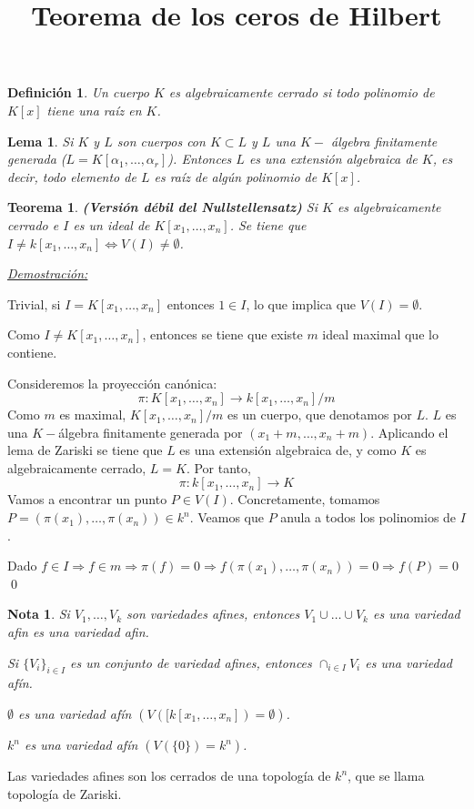 \documentclass{article}
\newtheorem{teor}{Teorema}
\newtheorem{nota}{Nota}
\newtheorem{Def}{Definición}
\newenvironment{itemize*}%
  {\vspace*{-0mm}
   \begin{itemize}%
    \setlength{\itemsep}{0pt}%
    \setlength{\parskip}{0pt}}%
  {\vspace*{-0mm}
   \end{itemize}}
\newtheorem{Lem}{Lema}
\begin{document}
\title{Teorema de los ceros de Hilbert}
\maketitle

\large

\begin{Def}
Un cuerpo $K$ es algebraicamente cerrado si todo polinomio de $K[x]$ tiene una raíz en $K$.  
\end{Def}
\begin{Lem}
Si $K$ y $L$ son cuerpos con $K\subset L$ y $L$ una $K-$ álgebra finitamente generada ($L=K[\alpha_1,\dots, \alpha_r]$). Entonces $L$ es una extensión algebraica de $K$, es decir, todo elemento de $L$ es raíz de algún polinomio de $K[x]$. 
\end{Lem}

\begin{teor}
 \textbf{(Versión débil del Nullstellensatz)} Si $K$ es algebraicamente cerrado e $I$ es un ideal de $K[x_1,\dots,x_n]$. Se tiene que $I\neq k[x_1,\dots, x_n] \Leftrightarrow V(I)\neq \emptyset$.
\end{teor}

\underline{\textit{Demostración:}}
\vspace{3mm}


\framebox{$\Leftarrow$} Trivial, si $I=K[x_1,\dots, x_n]$ entonces $1\in I$, lo que implica que $V(I)=\emptyset$.

\framebox{$\Rightarrow$} Como $I\neq K[x_1,\dots,x_n]$, entonces se tiene que existe $m$ ideal maximal que lo contiene.

Consideremos la proyección canónica:
$$ \pi: K[x_1,\dots,x_n] \rightarrow k[x_1,\dots,x_n]/m$$
Como $m$ es maximal, $K[x_1,\dots,x_n]/m$ es un cuerpo, que denotamos por $L$. $L$ es una $K-$álgebra finitamente generada por $(x_1+m,\dots, x_n+m)$. Aplicando el lema de Zariski se tiene que $L$ es una extensión algebraica de, y como $K$ es algebraicamente cerrado, $L=K$. Por tanto,
$$\pi : k[x_1,\dots,x_n] \rightarrow K$$
Vamos a encontrar un punto $P\in V(I)$. Concretamente, tomamos $P=(\pi(x_1),\dots, \pi(x_n)) \in k^n$. Veamos que $P$ anula a todos los polinomios de $I$.

Dado $f\in I \Rightarrow f\in m \Rightarrow \pi(f)=0 \Rightarrow f(\pi(x_1),\dots, \pi(x_n))=0 \Rightarrow f(P)=0$ \qed

\begin{nota}
  Si $V_1,\dots, V_k$ son variedades afines, entonces $V_1\cup \dots \cup V_k$ es una variedad afin es una variedad afin.
  \begin{itemize*}
  \item Si $\{ V_i \}_{i\in I}$ es un conjunto de variedad afines, entonces $\cap_{i\in I} V_i$ es una variedad afín.
  \item $\emptyset $ es una variedad afín $(V([k[x_1,\dots,x_n])=\emptyset)$.
  \item $k^n$ es una variedad afín $(V(\{0\})=k^n)$.
  \end{itemize*}
\end{nota}
Las variedades afines son los cerrados de una topología de $k^n$, que se llama topología de Zariski.
\end{document}
